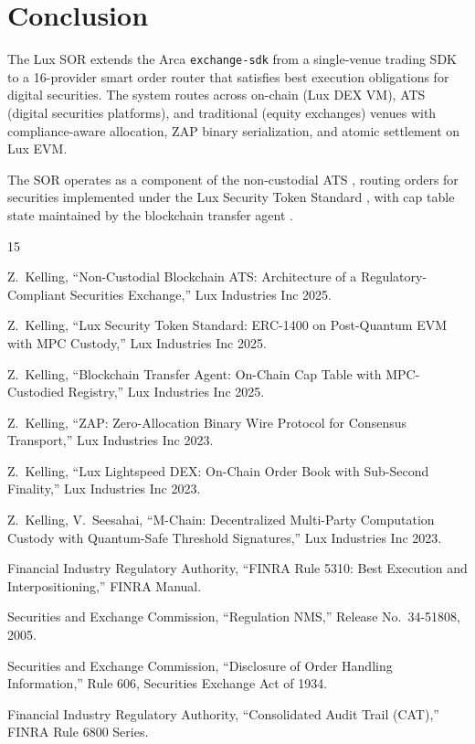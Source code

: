 \section{Conclusion}


The Lux SOR extends the Arca \texttt{exchange-sdk} from a single-venue trading SDK to a 16-provider smart order router that satisfies best execution obligations for digital securities. The system routes across on-chain (Lux DEX VM), ATS (digital securities platforms), and traditional (equity exchanges) venues with compliance-aware allocation, ZAP binary serialization, and atomic settlement on Lux EVM.

The SOR operates as a component of the non-custodial ATS \cite{lux-ats-architecture}, routing orders for securities implemented under the Lux Security Token Standard \cite{lux-security-token-standard}, with cap table state maintained by the blockchain transfer agent \cite{lux-transfer-agent}.

\begin{thebibliography}{15}

Z.~Kelling,
``Non-Custodial Blockchain ATS: Architecture of a Regulatory-Compliant Securities Exchange,''
Lux Industries Inc 2025.

Z.~Kelling,
``Lux Security Token Standard: ERC-1400 on Post-Quantum EVM with MPC Custody,''
Lux Industries Inc 2025.

Z.~Kelling,
``Blockchain Transfer Agent: On-Chain Cap Table with MPC-Custodied Registry,''
Lux Industries Inc 2025.

Z.~Kelling,
``ZAP: Zero-Allocation Binary Wire Protocol for Consensus Transport,''
Lux Industries Inc 2023.

Z.~Kelling,
``Lux Lightspeed DEX: On-Chain Order Book with Sub-Second Finality,''
Lux Industries Inc 2023.

Z.~Kelling, V.~Seesahai,
``M-Chain: Decentralized Multi-Party Computation Custody with Quantum-Safe Threshold Signatures,''
Lux Industries Inc 2023.

Financial Industry Regulatory Authority,
``FINRA Rule 5310: Best Execution and Interpositioning,''
FINRA Manual.

Securities and Exchange Commission,
``Regulation NMS,''
Release No.~34-51808, 2005.

Securities and Exchange Commission,
``Disclosure of Order Handling Information,''
Rule 606, Securities Exchange Act of 1934.

Financial Industry Regulatory Authority,
``Consolidated Audit Trail (CAT),''
FINRA Rule 6800 Series.

\end{thebibliography}

